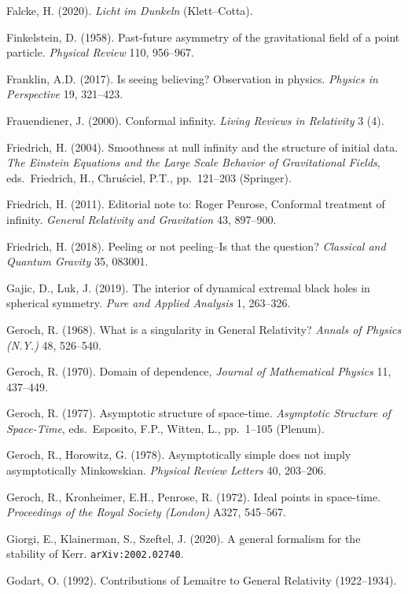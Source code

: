 \documentclass[12pt]{article}
\begin{document}
\begin{small}
\begin{thebibliography}{99}
\item[] Falcke, H. (2020). \emph{Licht im Dunkeln} (Klett--Cotta). 
\item[]  Finkelstein, D. (1958). Past-future asymmetry of the gravitational field of a point particle.
 \emph{Physical Review} 110, 956--967. 
 \item[] Franklin, A.D. (2017). Is seeing believing? Observation in physics. \emph{Physics in Perspective} 19, 321--423. 
\item[] Frauendiener, J. (2000). Conformal infinity.  \emph{Living Reviews in Relativity} 3 (4). 
\item[]  Friedrich, H. (2004). Smoothness at null infinity and the structure of initial data.
\emph{The Einstein Equations and the Large Scale Behavior of Gravitational Fields}, eds.\ 
Friedrich, H., Chru\'{s}ciel, P.T., pp.\ 121--203 (Springer).
\item[]  Friedrich, H. (2011). Editorial note to: Roger Penrose, Conformal treatment of infinity.  \emph{General Relativity and Gravitation} 43, 897--900.
\item[]  Friedrich, H. (2018). Peeling or not peeling--Is that the question?
\emph{Classical and Quantum Gravity} 35, 083001. 
  \item[]  Gajic, D., Luk, J. (2019). 
The interior of dynamical extremal black holes in spherical symmetry. \emph{Pure and Applied Analysis} 1, 263--326. 
  \item[]  Geroch, R.   (1968). What is a singularity in General Relativity? \emph{Annals of Physics (N.Y.)} 48, 526--540.
  \item[]  Geroch, R.   (1970). Domain of dependence, \emph{ Journal of Mathematical Physics} 11, 437--449.
    \item[]  Geroch, R.   (1977). Asymptotic structure of space-time. \emph{Asymptotic Structure of Space-Time}, eds.\ Esposito, F.P., Witten, L., pp.\ 1--105  (Plenum). 
      \item []  Geroch, R., Horowitz, G. (1978).
Asymptotically simple does not imply asymptotically Minkowskian. \emph{Physical Review Letters} 40, 203--206. 
    \item []  Geroch, R., Kronheimer, E.H.,  Penrose, R. (1972). Ideal points in space-time. 
  \emph{Proceedings of the Royal Society (London)} A327, 545--567. 
    \item[]
 Giorgi, E., Klainerman,  S., Szeftel, J. (2020).  A general formalism for the stability of Kerr. 
 \texttt{arXiv:2002.02740}. 
  \item[]  Godart, O. (1992). Contributions of Lemaitre to General Relativity (1922--1934).

\end{thebibliography}
\end{small}
\end{document}
